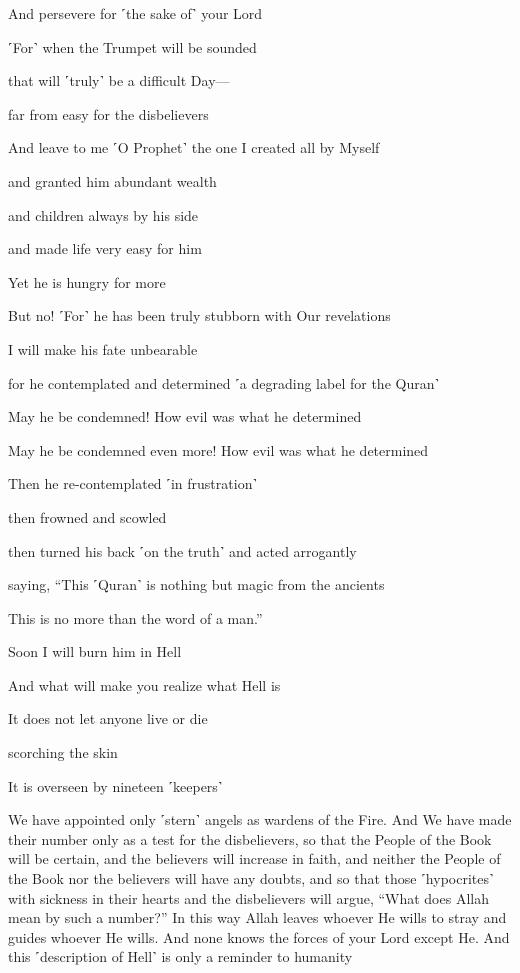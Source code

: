 And persevere for ˹the sake of˺ your Lord

˹For˺ when the Trumpet will be sounded

that will ˹truly˺ be a difficult Day—

far from easy for the disbelievers

And leave to me ˹O Prophet˺ the one I created all by Myself

and granted him abundant wealth

and children always by his side

and made life very easy for him

Yet he is hungry for more

But no! ˹For˺ he has been truly stubborn with Our revelations

I will make his fate unbearable

for he contemplated and determined ˹a degrading label for the Quran˺

May he be condemned! How evil was what he determined

May he be condemned even more! How evil was what he determined

Then he re-contemplated ˹in frustration˺

then frowned and scowled

then turned his back ˹on the truth˺ and acted arrogantly

saying, “This ˹Quran˺ is nothing but magic from the ancients

This is no more than the word of a man.”

Soon I will burn him in Hell

And what will make you realize what Hell is

It does not let anyone live or die

scorching the skin

It is overseen by nineteen ˹keepers˺

We have appointed only ˹stern˺ angels as wardens of the Fire. And We have made their number only as a test for the disbelievers, so that the People of the Book will be certain, and the believers will increase in faith, and neither the People of the Book nor the believers will have any doubts, and so that those ˹hypocrites˺ with sickness in their hearts and the disbelievers will argue, “What does Allah mean by such a number?” In this way Allah leaves whoever He wills to stray and guides whoever He wills. And none knows the forces of your Lord except He. And this ˹description of Hell˺ is only a reminder to humanity

